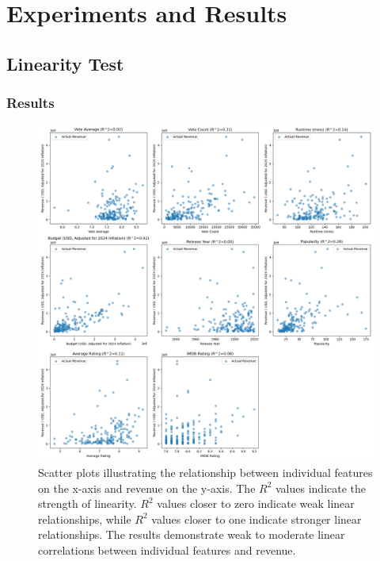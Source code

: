 \documentclass{article}
\begin{document}
\section{Experiments and Results}
\label{results}
\subsection{Linearity Test}
\subsubsection{Results}

\begin{figure}[H] 
    \centering
    \vspace{0.3cm} 
    \includegraphics[width=1.1\linewidth]{linear_test.png} %
    \caption{Scatter plots illustrating the relationship between individual features on the x-axis and revenue on the y-axis. The \( R^2 \) values indicate the strength of linearity. \( R^2 \) values closer to zero indicate weak linear relationships, while \( R^2 \) values closer to one indicate stronger linear relationships. The results demonstrate weak to moderate linear correlations between individual features and revenue.}
    \label{fig:scatter_plots}
\end{figure}
\end{document}

